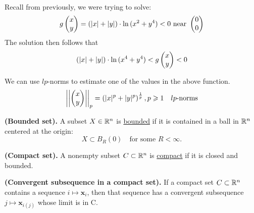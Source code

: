 \\

Recall from previously, we were trying to solve:
\[g\begin{pmatrix} x \\ y \end{pmatrix}= (|x|+|y|)\cdot \ln{(x^2+y^4)}<0 \text{ near }\begin{pmatrix} 0 \\ 0 \end{pmatrix}\]
The solution then follows that
\[(|x|+|y|)\cdot \ln{(x^4+y^4)}<g\begin{pmatrix} x \\ y \end{pmatrix}<0\]

We can use $lp$-norms to estimate one of the values in the above function.
\[\left|\left| \begin{pmatrix} x \\ y \end{pmatrix}\right|\right|_p=\left(|x|^p + |y|^p\right)^{\frac{1}{p}}, p\geqslant 1\quad lp\text{-norms}\]

\iffalse
\[(x^4+y^4)^{\frac{1}{4}}\cdot \ln{(x^4+y^4)}<(|x|+|y|)\cdot \ln{(x^4+y^4)}<g\Point{x \\ y}<0\]
We can then rewrite the new function as
\[f\Point{x \\ y}=f(x^2+y^2)=f(u)=u^{\frac{1}{4}}\cdot \ln{(u)}\]
\[\lim_{u\rightarrow 0} f(u)=\lim_{u\rightarrow 0} u^{\frac{1}{4}}\cdot \ln{(u)}=\lim_{u\rightarrow 0} \frac{\ln{(u)}}{u^{-\frac{1}{4}}}=\lim_{u\rightarrow 0} \frac{(\ln{(u)})'}{(u^{-\frac{1}{4}})'}=\lim_{u\rightarrow 0} \frac{u^{-1}}{\frac{1}{4}u^{5/4}}\] \fi


\begin{defn}
  \textbf{(Bounded set).} A subset $X\in \mathbb{R}^n$ is \ul{bounded} if it is contained in a ball in $\mathbb{R}^n$ centered at the origin:
  \[X\subset B_R(0)\quad \text{for some }R<\infty.\]
\end{defn}

\begin{defn}
  \textbf{(Compact set).} A nonempty subset $C\subset \mathbb{R}^n$ is \ul{compact} if it is closed and bounded.
\end{defn}

\begin{theorem}
  \textbf{(Convergent subsequence in a compact set).} If a compact set $C\subset \mathbb{R}^n$ contains a sequence $i\mapsto \bm{x}_i$, then that sequence has a convergent subsequence $j\mapsto \bm{x}_{i(j)}$ whose limit is in C.
\end{theorem}
